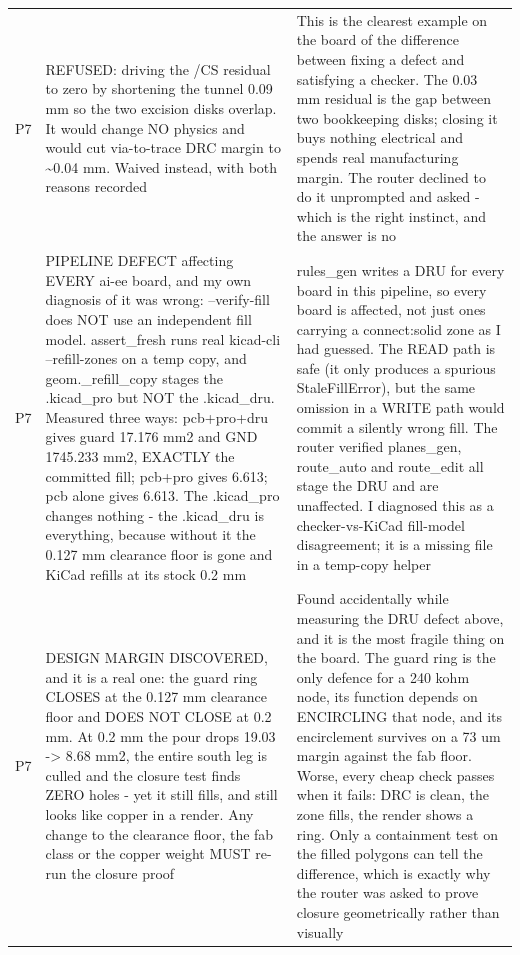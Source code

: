 \documentclass[11pt,a4paper]{article}
\begin{document}
{\begin{longtable}{lp{5.2cm}p{7.2cm}}
P7 & REFUSED: driving the /CS residual to zero by shortening the tunnel 0.09 mm so the two excision disks overlap. It would change NO physics and would cut via-to-trace DRC margin to \textasciitilde{}0.04 mm. Waived instead, with both reasons recorded & This is the clearest example on the board of the difference between fixing a defect and satisfying a checker. The 0.03 mm residual is the gap between two bookkeeping disks; closing it buys nothing electrical and spends real manufacturing margin. The router declined to do it unprompted and asked - which is the right instinct, and the answer is no \\
P7 & PIPELINE DEFECT affecting EVERY ai-ee board, and my own diagnosis of it was wrong: --verify-fill does NOT use an independent fill model. assert\_fresh runs real kicad-cli --refill-zones on a temp copy, and geom.\_refill\_copy stages the .kicad\_pro but NOT the .kicad\_dru. Measured three ways: pcb+pro+dru gives guard 17.176 mm2 and GND 1745.233 mm2, EXACTLY the committed fill; pcb+pro gives 6.613; pcb alone gives 6.613. The .kicad\_pro changes nothing - the .kicad\_dru is everything, because without it the 0.127 mm clearance floor is gone and KiCad refills at its stock 0.2 mm & rules\_gen writes a DRU for every board in this pipeline, so every board is affected, not just ones carrying a connect:solid zone as I had guessed. The READ path is safe (it only produces a spurious StaleFillError), but the same omission in a WRITE path would commit a silently wrong fill. The router verified planes\_gen, route\_auto and route\_edit all stage the DRU and are unaffected. I diagnosed this as a checker-vs-KiCad fill-model disagreement; it is a missing file in a temp-copy helper \\
P7 & DESIGN MARGIN DISCOVERED, and it is a real one: the guard ring CLOSES at the 0.127 mm clearance floor and DOES NOT CLOSE at 0.2 mm. At 0.2 mm the pour drops 19.03 -\textgreater{} 8.68 mm2, the entire south leg is culled and the closure test finds ZERO holes - yet it still fills, and still looks like copper in a render. Any change to the clearance floor, the fab class or the copper weight MUST re-run the closure proof & Found accidentally while measuring the DRU defect above, and it is the most fragile thing on the board. The guard ring is the only defence for a 240 kohm node, its function depends on ENCIRCLING that node, and its encirclement survives on a 73 um margin against the fab floor. Worse, every cheap check passes when it fails: DRC is clean, the zone fills, the render shows a ring. Only a containment test on the filled polygons can tell the difference, which is exactly why the router was asked to prove closure geometrically rather than visually \\

\end{longtable}}
\end{document}
